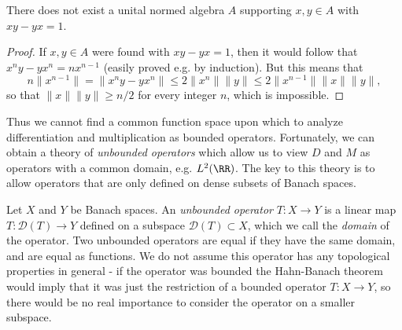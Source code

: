 \begin{lemma}
    There does not exist a unital normed algebra $A$ supporting $x,y \in A$ with $xy - yx = 1$.
\end{lemma}
\begin{proof}
    If $x,y \in A$ were found with $xy - yx = 1$, then it would follow that $x^n y - yx^n = nx^{n-1}$ (easily proved e.g. by induction). But this means that
    \[ n \| x^{n-1} \| = \| x^n y - yx^n \| \leq 2 \| x^n \| \| y \| \leq 2 \| x^{n-1} \| \| x \| \| y \|, \]
    so that $\| x \| \| y \| \geq n/2$ for every integer $n$, which is impossible.
\end{proof}

Thus we cannot find a common function space upon which to analyze differentiation and multiplication as bounded operators. Fortunately, we can obtain a theory of \emph{unbounded operators} which allow us to view $D$ and $M$ as operators with a common domain, e.g. $L^2(\RR)$. The key to this theory is to allow operators that are only defined on dense subsets of Banach spaces.

Let $X$ and $Y$ be Banach spaces. An \emph{unbounded operator} $T: X \to Y$ is a linear map $T: \mathcal{D}(T) \to Y$ defined on a subspace $\mathcal{D}(T) \subset X$, which we call the \emph{domain} of the operator. Two unbounded operators are equal if they have the same domain, and are equal as functions. We do not assume this operator has any topological properties in general - if the operator was bounded the Hahn-Banach theorem would imply that it was just the restriction of a bounded operator $T: X \to Y$, so there would be no real importance to consider the operator on a smaller subspace.

